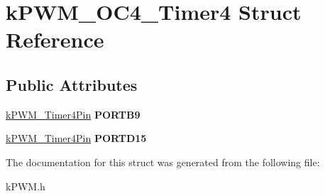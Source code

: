 \hypertarget{structkPWM__OC4__Timer4}{}\section{k\+P\+W\+M\+\_\+\+O\+C4\+\_\+\+Timer4 Struct Reference}
\label{structkPWM__OC4__Timer4}
\subsection*{Public Attributes}
\begin{DoxyCompactItemize}
\item 
\hyperlink{structkPWM__Timer4Pin}{k\+P\+W\+M\+\_\+\+Timer4\+Pin} {\bfseries P\+O\+R\+T\+B9}\hypertarget{structkPWM__OC4__Timer4_a411f4d52c412a39507b0543bbc6187e1}{}\label{structkPWM__OC4__Timer4_a411f4d52c412a39507b0543bbc6187e1}

\item 
\hyperlink{structkPWM__Timer4Pin}{k\+P\+W\+M\+\_\+\+Timer4\+Pin} {\bfseries P\+O\+R\+T\+D15}\hypertarget{structkPWM__OC4__Timer4_a59d2dc1ef60f58f7236bcd3e3748aa7d}{}\label{structkPWM__OC4__Timer4_a59d2dc1ef60f58f7236bcd3e3748aa7d}

\end{DoxyCompactItemize}


The documentation for this struct was generated from the following file\+:\begin{DoxyCompactItemize}
\item 
k\+P\+W\+M.\+h\end{DoxyCompactItemize}
